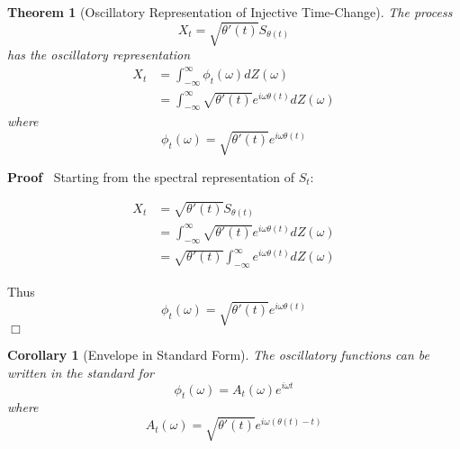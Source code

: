 \documentclass{article}
\newenvironment{proof}{\noindent\textbf{Proof\ }}{\hspace*{\fill}$\Box$\medskip}
\newtheorem{corollary}{Corollary}
\newtheorem{theorem}{Theorem}
\begin{document}
\begin{theorem}
  [Oscillatory Representation of Injective Time-Change] The process
  \begin{equation}
    X_t = \sqrt{\theta' (t)} S_{\theta (t)}
  \end{equation}
  has the oscillatory representation
  \begin{equation}
    \begin{array}{ll}
      X_t & = \int_{- \infty}^{\infty} \phi_t (\omega) dZ (\omega)\\
      & = \int_{- \infty}^{\infty}  \sqrt{\theta' (t)} e^{i \omega \theta
      (t)} dZ (\omega)
    \end{array}
  \end{equation}
  where
  \begin{equation}
    \phi_t (\omega) = \sqrt{\theta' (t)} e^{i \omega \theta (t)}
  \end{equation}
\end{theorem}

\begin{proof}
  Starting from the spectral representation of $S_t$:
  
  \begin{align}
    X_t & = \sqrt{\theta' (t)} S_{\theta (t)} \\
    & = \int_{- \infty}^{\infty} \sqrt{\theta' (t)} e^{i \omega \theta (t)}
    dZ (\omega) \\
    & = \sqrt{\theta' (t)}  \int_{- \infty}^{\infty} e^{i \omega \theta (t)}
    dZ (\omega) 
  \end{align}
  
  Thus
  \begin{equation}
    \phi_t (\omega) = \sqrt{\theta' (t)} e^{i \omega \theta (t)}
  \end{equation}
\end{proof}

\begin{corollary}
  [Envelope in Standard Form] The oscillatory functions can be written in the
  standard for
  \begin{equation}
    \phi_t (\omega) = A_t (\omega) e^{i \omega t}
  \end{equation}
  where
  \begin{equation}
    A_t (\omega) = \sqrt{\theta' (t)} e^{i \omega (\theta (t) - t)}
  \end{equation}
\end{corollary}
\end{document}
